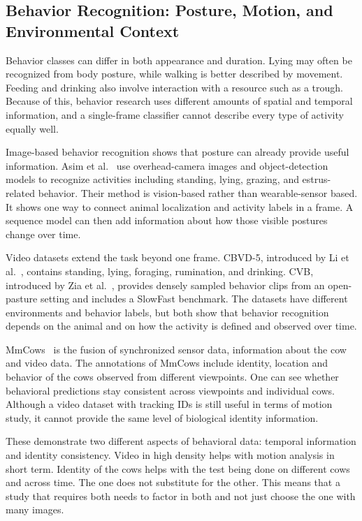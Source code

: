 \subsection{Behavior Recognition: Posture, Motion, and Environmental Context}

Behavior classes can differ in both appearance and duration. Lying may often be recognized from body posture, while walking is better described by movement. Feeding and drinking also involve interaction with a resource such as a trough. Because of this, behavior research uses different amounts of spatial and temporal information, and a single-frame classifier cannot describe every type of activity equally well.

Image-based behavior recognition shows that posture can already provide useful information. Asim et al.~\cite{asim2026s260} use overhead-camera images and object-detection models to recognize activities including standing, lying, grazing, and estrus-related behavior. Their method is vision-based rather than wearable-sensor based. It shows one way to connect animal localization and activity labels in a frame. A sequence model can then add information about how those visible postures change over time.

Video datasets extend the task beyond one frame. CBVD-5, introduced by Li et al.~\cite{li2024cbvd5}, contains standing, lying, foraging, rumination, and drinking. CVB, introduced by Zia et al.~\cite{zia2023cvb}, provides densely sampled behavior clips from an open-pasture setting and includes a SlowFast benchmark. The datasets have different environments and behavior labels, but both show that behavior recognition depends on the animal and on how the activity is defined and observed over time.

MmCows~\cite{vu2024mmcows} is the fusion of synchronized sensor data, information about the cow and video data. The annotations of MmCows include identity, location and behavior of the cows observed from different viewpoints. One can see whether behavioral predictions stay consistent across viewpoints and individual cows. Although a video dataset with tracking IDs is still useful in terms of motion study, it cannot provide the same level of biological identity information.

These demonstrate two different aspects of behavioral data: temporal information and identity consistency. Video in high density helps with motion analysis in short term. Identity of the cows helps with the test being done on different cows and across time. The one does not substitute for the other. This means that a study that requires both needs to factor in both and not just choose the one with many images.

